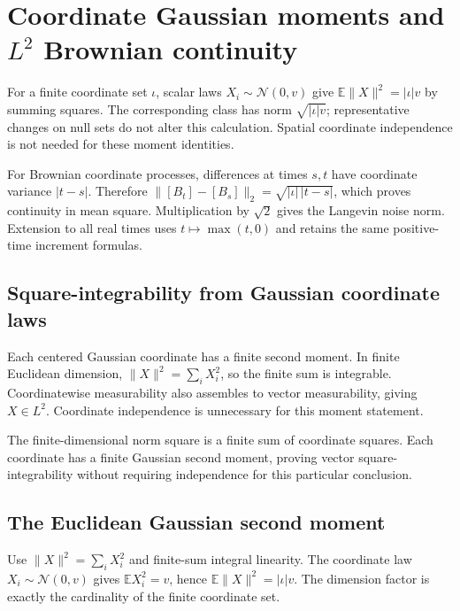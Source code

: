 \documentclass[11pt,a4paper]{article}
\begin{document}
\section{\texorpdfstring{Coordinate Gaussian moments and \(L^2\) Brownian continuity}{Coordinate Gaussian moments and L² Brownian continuity}}


For a finite coordinate set \(\iota\), scalar laws \(X_i\sim\mathcal N(0,v)\) give \(\mathbb E\|X\|^2=|\iota|v\) by summing squares. The corresponding class has norm \(\sqrt{|\iota|v}\); representative changes on null sets do not alter this calculation. Spatial coordinate independence is not needed for these moment identities.



For Brownian coordinate processes, differences at times \(s,t\) have coordinate variance \(|t-s|\). Therefore \(\|[B_t]-[B_s]\|_2=\sqrt{|\iota|\,|t-s|}\), which proves continuity in mean square. Multiplication by \(\sqrt2\) gives the Langevin noise norm. Extension to all real times uses \(t\mapsto\max(t,0)\) and retains the same positive-time increment formulas.


\subsection{\texorpdfstring{Square-integrability from Gaussian coordinate laws}{Square-integrability from Gaussian coordinate laws}}


Each centered Gaussian coordinate has a finite second moment. In finite Euclidean dimension, \(\|X\|^2=\sum_iX_i^2\), so the finite sum is integrable. Coordinatewise measurability also assembles to vector measurability, giving \(X\in L^2\). Coordinate independence is unnecessary for this moment statement.



The finite-dimensional norm square is a finite sum of coordinate squares. Each coordinate has a finite Gaussian second moment, proving vector square-integrability without requiring independence for this particular conclusion.


\subsection{\texorpdfstring{The Euclidean Gaussian second moment}{The Euclidean Gaussian second moment}}


Use \(\|X\|^2=\sum_iX_i^2\) and finite-sum integral linearity. The coordinate law \(X_i\sim\mathcal N(0,v)\) gives \(\mathbb EX_i^2=v\), hence \(\mathbb E\|X\|^2=|\iota|v\). The dimension factor is exactly the cardinality of the finite coordinate set.
\end{document}
